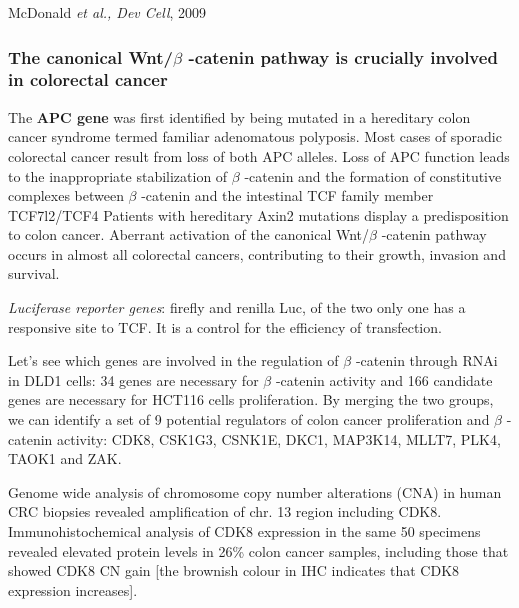 McDonald \emph{et al., Dev Cell}, 2009

\hypertarget{the-canonical-wntux3b2-catenin-pathway-is-crucially-involved-in-colorectal-cancer}{%
\subsubsection{\texorpdfstring{\textbf{The canonical Wnt/$\beta$  -catenin pathway is crucially involved in colorectal cancer}}{The canonical Wnt/$\beta$  -catenin pathway is crucially involved in colorectal cancer}}\label{the-canonical-wntux3b2-catenin-pathway-is-crucially-involved-in-colorectal-cancer}}

The \textbf{APC gene} was first identified by being mutated in a hereditary colon cancer syndrome termed familiar adenomatous polyposis. Most cases of sporadic colorectal cancer result from loss of both APC alleles. Loss of APC function leads to the inappropriate stabilization of $\beta$  -catenin and the formation of constitutive complexes between $\beta$  -catenin and the intestinal TCF family member TCF7l2/TCF4 Patients with hereditary Axin2 mutations display a predisposition to colon cancer. Aberrant activation of the canonical Wnt/$\beta$  -catenin pathway occurs in almost all colorectal cancers, contributing to their growth, invasion and survival.

\emph{Luciferase reporter genes}: firefly and renilla Luc, of the two only one has a responsive site to TCF. It is a control for the efficiency of transfection.

Let's see which genes are involved in the regulation of $\beta$  -catenin through RNAi in DLD1 cells: 34 genes are necessary for $\beta$  -catenin activity and 166 candidate genes are necessary for HCT116 cells proliferation. By merging the two groups, we can identify a set of 9 potential regulators of colon cancer proliferation and $\beta$  -catenin activity: CDK8, CSK1G3, CSNK1E, DKC1, MAP3K14, MLLT7, PLK4, TAOK1 and ZAK.

Genome wide analysis of chromosome copy number alterations (CNA) in human CRC biopsies revealed amplification of chr. 13 region including CDK8. Immunohistochemical analysis of CDK8 expression in the same 50 specimens revealed elevated protein levels in 26\% colon cancer samples, including those that showed CDK8 CN gain {[}the brownish colour in IHC indicates that CDK8 expression increases{]}.

